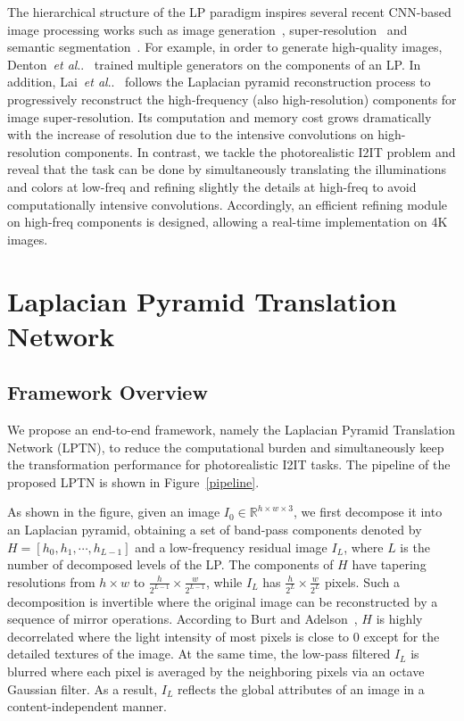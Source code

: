 \documentclass[10pt,twocolumn,letterpaper]{article}
\makeatletter
\DeclareRobustCommand\onedot{\futurelet\@let@token\@onedot}
\def\@onedot{\ifx\@let@token.\else.\null\fi\xspace}
\def\etal{\emph{et al}\onedot}
\makeatother
\begin{document}
	The hierarchical structure of the LP paradigm inspires several recent CNN-based image processing works such as image generation~\cite{denton2015deep}, super-resolution~\cite{lai2017deep} and semantic segmentation~\cite{ghiasi2016laplacian}. For example, in order to generate high-quality images, Denton~\etal~\cite{denton2015deep} trained multiple generators on the components of an LP. In addition, Lai~\etal~\cite{lai2017deep} follows the Laplacian pyramid reconstruction process to progressively reconstruct the high-frequency (also high-resolution) components for image super-resolution. Its computation and memory cost grows dramatically with the increase of resolution due to the intensive convolutions on high-resolution components. In contrast, we tackle the photorealistic I2IT problem and reveal that the task can be done by simultaneously translating the illuminations and colors at low-freq and refining slightly the details at high-freq to avoid computationally intensive convolutions. Accordingly, an efficient refining module on high-freq components is designed, allowing a real-time implementation on 4K images.
	
	
	\section{Laplacian Pyramid Translation Network}
	
	\subsection{Framework Overview}
	\label{laplacian_pyramid}
	
	We propose an end-to-end framework, namely the Laplacian Pyramid Translation Network (LPTN), to reduce the computational burden and simultaneously keep the transformation performance for photorealistic I2IT tasks. The pipeline of the proposed LPTN is shown in Figure~\ref{pipeline}.
	
	As shown in the figure, given an image $I_0\in\mathbb{R}^{h\times w\times 3}$, we first decompose it into an Laplacian pyramid, obtaining a set of band-pass components denoted by $H = [h_0, h_1, \cdots, h_{L-1}]$ and a low-frequency residual image $I_L$, where $L$ is the number of decomposed levels of the LP. The components of $H$ have tapering resolutions from $h\times w$ to $\frac{h}{2^{L-1}}\times \frac{w}{2^{L-1}}$, while $I_L$ has $\frac{h}{2^{L}}\times \frac{w}{2^{L}}$ pixels. Such a decomposition is invertible where the original image can be reconstructed by a sequence of mirror operations. According to Burt and Adelson~\cite{burt1983laplacian}, $H$ is highly decorrelated where the light intensity of most pixels is close to $0$ except for the detailed textures of the image. At the same time, the low-pass filtered $I_L$ is blurred where each pixel is averaged by the neighboring pixels via an octave Gaussian filter. As a result, $I_L$ reflects the global attributes of an image in a content-independent manner.
	
\end{document}
